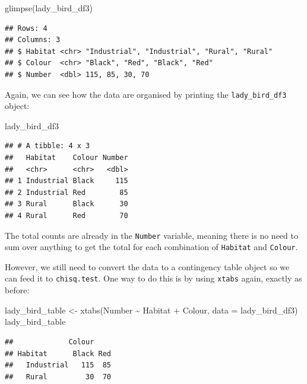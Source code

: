 \documentclass[
]{book}
\newenvironment{Shaded}{\begin{snugshade}}{\end{snugshade}}
\newcommand{\AttributeTok}[1]{\textcolor[rgb]{0.77,0.63,0.00}{#1}}
\newcommand{\FunctionTok}[1]{\textcolor[rgb]{0.00,0.00,0.00}{#1}}
\newcommand{\NormalTok}[1]{#1}
\newcommand{\OtherTok}[1]{\textcolor[rgb]{0.56,0.35,0.01}{#1}}
\newcommand{\SpecialCharTok}[1]{\textcolor[rgb]{0.00,0.00,0.00}{#1}}
\begin{document}
\begin{Shaded}
\begin{Highlighting}[]
\FunctionTok{glimpse}\NormalTok{(lady\_bird\_df3)}
\end{Highlighting}
\end{Shaded}

\begin{verbatim}
## Rows: 4
## Columns: 3
## $ Habitat <chr> "Industrial", "Industrial", "Rural", "Rural"
## $ Colour  <chr> "Black", "Red", "Black", "Red"
## $ Number  <dbl> 115, 85, 30, 70
\end{verbatim}

Again, we can see how the data are organised by printing the \texttt{lady\_bird\_df3} object:

\begin{Shaded}
\begin{Highlighting}[]
\NormalTok{lady\_bird\_df3}
\end{Highlighting}
\end{Shaded}

\begin{verbatim}
## # A tibble: 4 x 3
##   Habitat    Colour Number
##   <chr>      <chr>   <dbl>
## 1 Industrial Black     115
## 2 Industrial Red        85
## 3 Rural      Black      30
## 4 Rural      Red        70
\end{verbatim}

The total counts are already in the \texttt{Number} variable, meaning there is no need to sum over anything to get the total for each combination of \texttt{Habitat} and \texttt{Colour}.

However, we still need to convert the data to a contingency table object so we can feed it to \texttt{chisq.test}. One way to do this is by using \texttt{xtabs} again, exactly as before:

\begin{Shaded}
\begin{Highlighting}[]
\NormalTok{lady\_bird\_table }\OtherTok{\textless{}{-}} \FunctionTok{xtabs}\NormalTok{(Number }\SpecialCharTok{\textasciitilde{}}\NormalTok{ Habitat }\SpecialCharTok{+}\NormalTok{ Colour, }\AttributeTok{data =}\NormalTok{ lady\_bird\_df3)}
\NormalTok{lady\_bird\_table}
\end{Highlighting}
\end{Shaded}

\begin{verbatim}
##             Colour
## Habitat      Black Red
##   Industrial   115  85
##   Rural         30  70
\end{verbatim}
\end{document}
